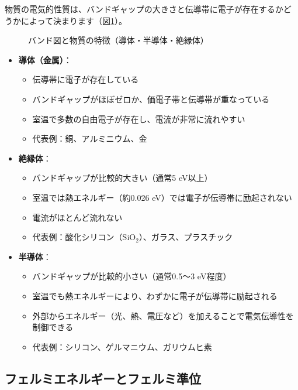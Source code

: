 物質の電気的性質は、バンドギャップの大きさと伝導帯に電子が存在するかどうかによって決まります（図\ref{fig:band_materials}）。

\begin{figure}[H]
\centering
{}
\caption{バンド図と物質の特徴（導体・半導体・絶縁体）}
\label{fig:band_materials}
\end{figure}

\begin{itemize}
\item \textbf{導体（金属）}：
\begin{itemize}
\item 伝導帯に電子が存在している
\item バンドギャップがほぼゼロか、価電子帯と伝導帯が重なっている
\item 室温で多数の自由電子が存在し、電流が非常に流れやすい
\item 代表例：銅、アルミニウム、金
\end{itemize}

\item \textbf{絶縁体}：
\begin{itemize}
\item バンドギャップが比較的大きい（通常5 eV以上）
\item 室温では熱エネルギー（約0.026 eV）では電子が伝導帯に励起されない
\item 電流がほとんど流れない
\item 代表例：酸化シリコン（SiO$_2$）、ガラス、プラスチック
\end{itemize}

\item \textbf{半導体}：
\begin{itemize}
\item バンドギャップが比較的小さい（通常0.5〜3 eV程度）
\item 室温でも熱エネルギーにより、わずかに電子が伝導帯に励起される
\item 外部からエネルギー（光、熱、電圧など）を加えることで電気伝導性を制御できる
\item 代表例：シリコン、ゲルマニウム、ガリウムヒ素
\end{itemize}
\end{itemize}

\subsection{フェルミエネルギーとフェルミ準位}


